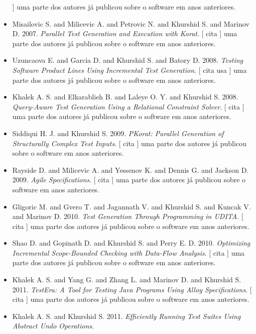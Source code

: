 \begin{itemize}
      ]
uma parte dos autores já publicou sobre o software em anos anteriores.
\item Misailovic S. and Milicevic A. and Petrovic N. and Khurshid S. and Marinov D.
      2007.
        \textit{ Parallel Test Generation and Execution with Korat}.
      [
          cita
      ]
uma parte dos autores já publicou sobre o software em anos anteriores.
\item Uzuncaova E. and Garcia D. and Khurshid S. and Batory D.
      2008.
        \textit{ Testing Software Product Lines Using Incremental Test Generation}.
      [
          cita
          usa
      ]
uma parte dos autores já publicou sobre o software em anos anteriores.
\item Khalek A. S. and Elkarablieh B. and Laleye O. Y. and Khurshid S.
      2008.
        \textit{ Query-Aware Test Generation Using a Relational Constraint Solver}.
      [
          cita
      ]
uma parte dos autores já publicou sobre o software em anos anteriores.
\item Siddiqui H. J. and Khurshid S.
      2009.
        \textit{ PKorat: Parallel Generation of Structurally Complex Test Inputs}.
      [
          cita
      ]
uma parte dos autores já publicou sobre o software em anos anteriores.
\item Rayside D. and Milicevic A. and Yessenov K. and Dennis G. and Jackson D.
      2009.
        \textit{ Agile Specifications}.
      [
          cita
      ]
uma parte dos autores já publicou sobre o software em anos anteriores.
\item Gligoric M. and Gvero T. and Jagannath V. and Khurshid S. and Kuncak V. and Marinov D.
      2010.
        \textit{ Test Generation Through Programming in UDITA}.
      [
          cita
      ]
uma parte dos autores já publicou sobre o software em anos anteriores.
\item Shao D. and Gopinath D. and Khurshid S. and Perry E. D.
      2010.
        \textit{ Optimizing Incremental Scope-Bounded Checking with Data-Flow Analysis}.
      [
          cita
      ]
uma parte dos autores já publicou sobre o software em anos anteriores.
\item Khalek A. S. and Yang G. and Zhang L. and Marinov D. and Khurshid S.
      2011.
        \textit{ TestEra: A Tool for Testing Java Programs Using Alloy Specifications}.
      [
          cita
      ]
uma parte dos autores já publicou sobre o software em anos anteriores.
\item Khalek A. S. and Khurshid S.
      2011.
        \textit{ Efficiently Running Test Suites Using Abstract Undo Operations}.

\end{itemize}
